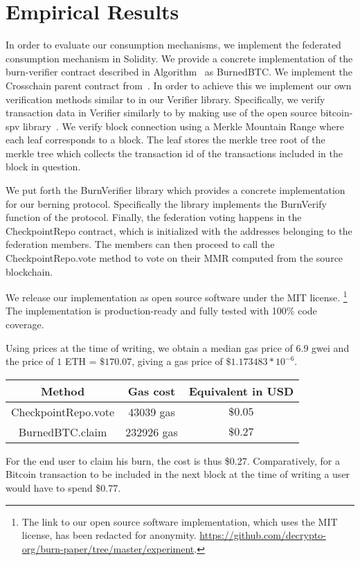 \section{Empirical Results}

\newcommand{\rref}[1]{}

In order to evaluate our consumption mechanisms, we implement the federated consumption mechanism in Solidity. We provide a concrete implementation of the \textsf{burn-verifier} contract described in Algorithm~\rref{alg.burn-verifier} as \textsf{BurnedBTC}. We implement the \textsf{Crosschain} parent contract from~\cite{pow-sidechains}. In order to achieve this we implement our own verification methods similar to \rref{alg.verify-event-federation} in our \textsf{Verifier} library. Specifically, we verify transaction data in \textsf{Verifier} similarly to \rref{alg.verify-tx} by making use of the open source bitcoin-spv library~\cite{bitcoin-spv-library}. We verify block connection using a Merkle Mountain Range where each leaf corresponds to a block. The leaf stores the merkle tree root of the merkle tree which collects the transaction id of the transactions included in the block in question.

We put forth the \textsf{BurnVerifier} library which provides a concrete implementation for our berning protocol. Specifically the library implements the \textsf{BurnVerify} function of the protocol. Finally, the federation voting happens in the \textsf{CheckpointRepo} contract, which is initialized with the addresses belonging to the federation members. The members can then proceed to call the \textsf{CheckpointRepo.vote} method to vote on their MMR computed from the source blockchain.

We release our implementation as open source software under the MIT license.
\footnote{
    \ifanonymous
        The link to our open source software implementation, which uses the MIT license, has been redacted for anonymity.
    \else
        \url{https://github.com/decrypto-org/burn-paper/tree/master/experiment}.
    \fi
}
The implementation is production-ready and fully tested with 100\% code coverage.

Using prices at the time of writing, we obtain a median gas price of $6.9$ gwei and the price of $1$ ETH = $\$170.07$, giving a gas price of $\$1.173483 * 10^{-6}$.

\begin{center}
    \begin{tabular}{ |c|c|c| }
     \hline
     Method & Gas cost & Equivalent in USD \\
     \hline
     \textsf{CheckpointRepo.vote} & 43039 gas & $\$0.05$ \\
     \textsf{BurnedBTC.claim} & 232926 gas & $\$0.27$ \\
     \hline
    \end{tabular}
\end{center}

For the end user to claim his burn, the cost is thus \$0.27. Comparatively, for a Bitcoin transaction to be included in the next block at the time of writing a user would have to spend \$0.77.
